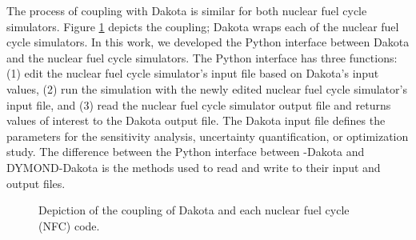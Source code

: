 The process of coupling with Dakota is similar 
for both nuclear fuel cycle simulators. 
Figure \ref{fig:dakota-NFC-flow} depicts the coupling; 
Dakota wraps each of the nuclear fuel cycle simulators.
In this work, we developed the Python interface between 
Dakota and the nuclear fuel cycle simulators.
The Python interface has three functions: 
(1) edit the nuclear fuel cycle simulator's input file based on Dakota's input values, 
(2) run the simulation with the newly edited nuclear fuel cycle simulator's input file, and 
(3) read the nuclear fuel cycle simulator output file and returns values of interest 
to the Dakota output file. 
The Dakota input file defines the parameters for the sensitivity analysis, 
uncertainty quantification, or optimization study.
The difference between the Python interface between \Cyclus-Dakota and DYMOND-Dakota 
is the methods used to read and write to their input and output files. 

\begin{figure}[]
    \centering
    \caption{Depiction of the coupling of Dakota and each nuclear fuel cycle (NFC) code.}
    \label{fig:dakota-NFC-flow}
\end{figure}

